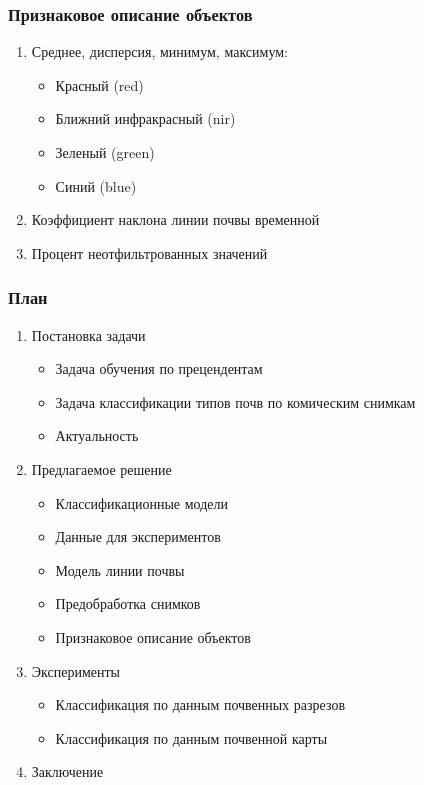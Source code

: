 \documentclass{beamer}
\begin{document}
\begin{frame}
\frametitle{Признаковое описание объектов}
\begin{enumerate}
\item Среднее, дисперсия, минимум, максимум:
    \begin{itemize}
        \item Красный (red)
        \item Ближний инфракрасный (nir)
        \item Зеленый (green)
        \item Синий (blue)
    \end{itemize}
\item Коэффициент наклона линии почвы временной
\item Процент неотфильтрованных значений
\end{enumerate}
\end{frame}

\begin{frame}
\frametitle{План}
\begin{enumerate}
    \item Постановка задачи
        \begin{itemize}
            \item Задача обучения по прецендентам
            \item Задача классификации типов почв по комическим снимкам
            \item Актуальность
        \end{itemize}
    \item Предлагаемое решение
    \begin{itemize}
        \item Классификационные модели
        \item Данные для экспериментов
        \item Модель линии почвы
        \item Предобработка снимков
        \item Признаковое описание объектов
    \end{itemize}
    \item {\color{blue} Эксперименты}
    \begin{itemize}
        \item Классификация по данным почвенных разрезов
        \item Классификация по данным почвенной карты
    \end{itemize}
    \item Заключение
\end{enumerate}
\end{frame}
\end{document}
